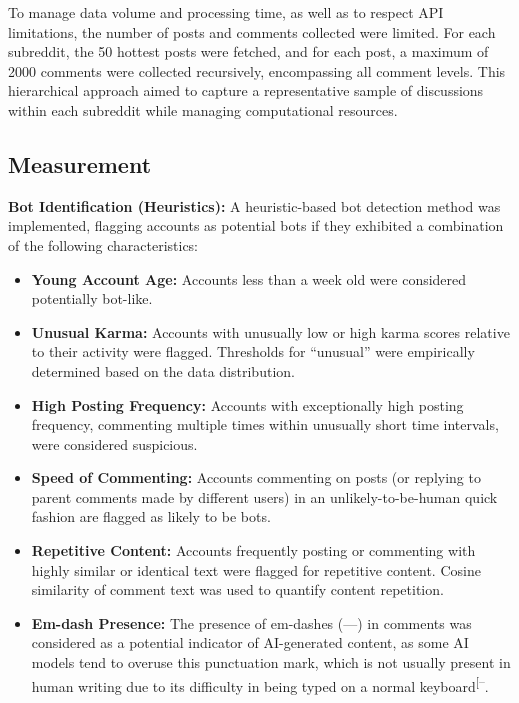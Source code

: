 \documentclass[
  12pt,
  letterpaper,
  DIV=11,
  numbers=noendperiod]{scrartcl}
\providecommand{\tightlist}{%
  \setlength{\itemsep}{0pt}\setlength{\parskip}{0pt}}\usepackage{longtable,booktabs,array}
\begin{document}
To manage data volume and processing time, as well as to respect API
limitations, the number of posts and comments collected were limited.
For each subreddit, the 50 hottest posts were fetched, and for each
post, a maximum of 2000 comments were collected recursively,
encompassing all comment levels. This hierarchical approach aimed to
capture a representative sample of discussions within each subreddit
while managing computational resources.

\subsection{Measurement}\label{measurement}

\textbf{Bot Identification (Heuristics):} A heuristic-based bot
detection method was implemented, flagging accounts as potential bots if
they exhibited a combination of the following characteristics:

\begin{itemize}
\tightlist
\item
  \textbf{Young Account Age:} Accounts less than a week old were
  considered potentially bot-like.
\item
  \textbf{Unusual Karma:} Accounts with unusually low or high karma
  scores relative to their activity were flagged. Thresholds for
  ``unusual'' were empirically determined based on the data
  distribution.
\item
  \textbf{High Posting Frequency:} Accounts with exceptionally high
  posting frequency, commenting multiple times within unusually short
  time intervals, were considered suspicious.
\item
  \textbf{Speed of Commenting:} Accounts commenting on posts (or
  replying to parent comments made by different users) in an
  unlikely-to-be-human quick fashion are flagged as likely to be bots.
\item
  \textbf{Repetitive Content:} Accounts frequently posting or commenting
  with highly similar or identical text were flagged for repetitive
  content. Cosine similarity of comment text was used to quantify
  content repetition.
\item
  \textbf{Em-dash Presence:} The presence of em-dashes (---) in comments
  was considered as a potential indicator of AI-generated content, as
  some AI models tend to overuse this punctuation mark, which is not
  usually present in human writing due to its difficulty in being typed
  on a normal
  keyboard\textsuperscript{{[}--\citeproc{ref-nightwateremdash}{22}{]}}.
\end{itemize}
\end{document}
